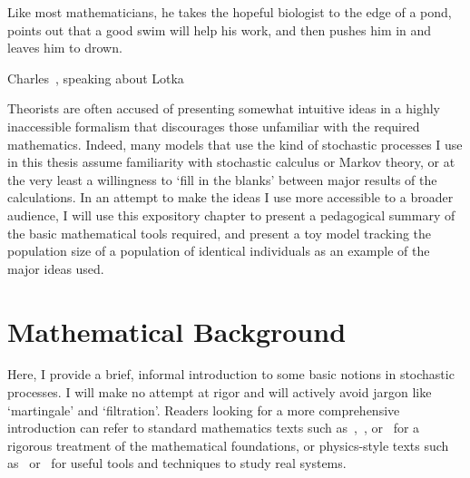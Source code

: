 \epigraph{\justifying Like most mathematicians, he takes the hopeful biologist to the edge of a pond, points out that a good swim will help his work, and then pushes him in and leaves him to drown.}{Charles~\citet{elton_eppur_1935}, speaking about Lotka}

Theorists are often accused of presenting somewhat intuitive ideas in a highly inaccessible formalism that discourages those unfamiliar with the required mathematics. Indeed, many models that use the kind of stochastic processes I use in this thesis assume familiarity with stochastic calculus or Markov theory, or at the very least a willingness to `fill in the blanks' between major results of the calculations. In an attempt to make the ideas I use more accessible to a broader audience, I will use this expository chapter to present a pedagogical summary of the basic mathematical tools required, and present a toy model tracking the population size of a population of identical individuals as an example of the major ideas used.

\section{Mathematical Background}\label{sec_math_background}

Here, I provide a brief, informal introduction to some basic notions in stochastic processes. I will make no attempt at rigor and will actively avoid jargon like `martingale' and `filtration'. Readers looking for a more comprehensive introduction can refer to standard mathematics texts such as~\citet{oksendal_stochastic_1998},~\citet{ethier_markov_1986}, or~\citet{karatzas_brownian_1998} for a rigorous treatment of the mathematical foundations, or physics-style texts such as~\citet{gardiner_stochastic_2009} or~\citet{van_kampen_stochastic_1981} for useful tools and techniques to study real systems.

